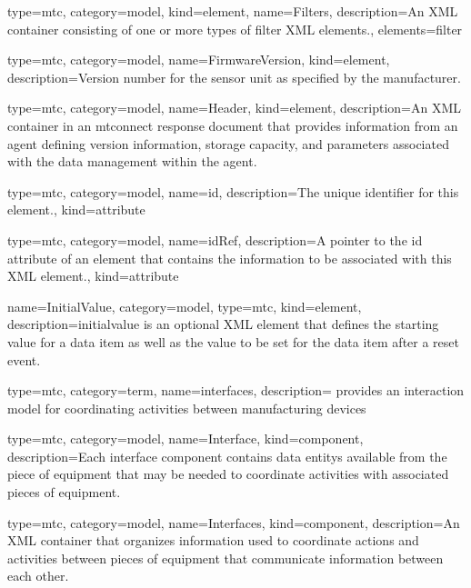 {
  type=mtc,
  category=model,
  kind={element},
  name={Filters},
  description={An XML container consisting of one or more types of \gls{filter} XML elements.},
  elements={\gls{filter}}
}


{
  type=mtc,
  category=model,
  name={FirmwareVersion},
  kind={element},
  description={Version number for the sensor unit as specified by the manufacturer.}
}


{
  type=mtc,
  category=model,
  name={Header},
  kind={element},
  description={An XML container in an \gls{mtconnect response document} that provides information from an \gls{agent} defining version information, storage capacity, and parameters associated with the data management within the \gls{agent}.}
}


{
  type=mtc,
  category=model,
  name={id},
  description={The unique identifier for this element.},
  kind={attribute}
}

{
  type=mtc,
  category=model,
  name={idRef},
  description={A pointer to the \gls{id} attribute of an element that contains the information to be associated with this XML element.},
  kind={attribute}
}

{
  name={InitialValue},
  category=model,
  type=mtc,
  kind={element},
  description={\gls{initialvalue} is an optional XML element that defines the starting value for a data item as well as the value to be set for the data item after a reset event.}
}


{
  type=mtc,
  category=term,
  name={interfaces},
  description={ provides an interaction model for coordinating activities between manufacturing devices}
}


{
  type=mtc,
  category=model,
  name={Interface},
  kind={component},
  description={Each \gls{interface component} contains \glspl{data entity} available from the piece of equipment that may be needed to coordinate activities with associated pieces of equipment.}
}

{
  type=mtc,
  category=model,
  name={Interfaces},
  kind={component},
  description={An XML container that organizes information used to coordinate actions and activities between pieces of equipment that communicate information between each other. }
}


